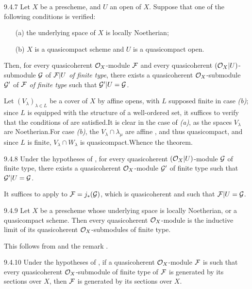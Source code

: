 \documentclass[../main.tex]{subfiles}
\begin{document}
\begin{env}[Theorem]{9.4.7}
Let $X$ be a prescheme, and $U$ an open of $X$.
Suppose that one of the following conditions is verified:
\begin{itemize}
  \item[(a)] the underlying space of $X$ is locally Noetherian;
  \item[(b)] $X$ is a quasicompact scheme and $U$ is a quasicompact open.
\end{itemize}
Then, for every quasicoherent $\mathcal{O}_X$-module $\mathcal{F}$ and every quasicoherent
$(\mathcal{O}_X|U)$-submodule $\mathcal{G}$ of $\mathcal{F}|U$ \emph{of finite type}, there exists a
quasicoherent $\mathcal{O}_X$-submodule $\mathcal{G}'$ of $\mathcal{F}$ \emph{of finite type}
such that $\mathcal{G}'|U=\mathcal{G}$.
\end{env}

Let $(V_\lambda)_{\lambda\in L}$ be a cover of $X$ by affine opens,
with $L$ supposed finite in case \emph{(b)}; since $L$ is equipped with the
structure of a well-ordered set, it suffices to verify that the conditions of
 are satisfied.It is clear in the case of \emph{(a)}, as the spaces
$V_\lambda$ are Noetherian.For case \emph{(b)}, the $V_\lambda\cap\lambda_\mu$
are affine , and thus quasicompact, and since $L$ is finite,
$V_\lambda\cap W_\lambda$ is quasicompact.Whence the theorem.

\begin{env}[Corollary]{9.4.8}
Under the hypotheses of , for every quasicoherent $(\mathcal{O}_X|U)$-module
$\mathcal{G}$ of finite type, there exists a quasicoherent $\mathcal{O}_X$-module $\mathcal{G}'$
of finite type such that $\mathcal{G}'|U=\mathcal{G}$.
\end{env}

It suffices to apply  to $\mathcal{F}=j_\ast(\mathcal{G})$, which is
quasicoherent  and such that $\mathcal{F}|U=\mathcal{G}$.

\begin{env}[Corollary]{9.4.9}
Let $X$ be a prescheme whose underlying space is locally Noetherian, or a
quasicompact scheme. Then every quasicoherent $\mathcal{O}_X$-module is the inductive limit
of its quasicoherent $\mathcal{O}_X$-submodules of finite type.
\end{env}

This follows from  and the remark .

\begin{env}[Corollary]{9.4.10}
Under the hypotheses of , if a quasicoherent $\mathcal{O}_X$-module $\mathcal{F}$
is such that every quasicoherent $\mathcal{O}_X$-submodule of finite type of $\mathcal{F}$ is
generated by its sections over $X$, then $\mathcal{F}$ is generated by its sections
over $X$.
\end{env}
\end{document}
